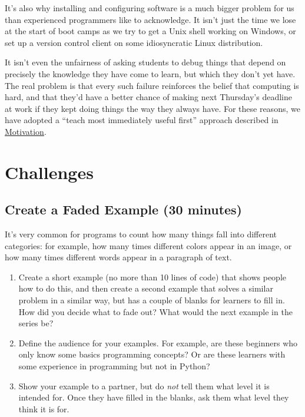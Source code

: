 \documentclass[10pt,statementpaper]{memoir}
\begin{document}
It's also why installing and configuring software is a much bigger
problem for us than experienced programmers like to acknowledge. It
isn't just the time we lose at the start of boot camps as we try to get
a Unix shell working on Windows, or set up a version control client on
some idiosyncratic Linux distribution.

It isn't even the unfairness of asking students to debug things that
depend on precisely the knowledge they have come to learn, but which
they don't yet have. The real problem is that every such failure
reinforces the belief that computing is hard, and that they'd have a
better chance of making next Thursday's deadline at work if they kept
doing things the way they always have. For these reasons, we have
adopted a ``teach most immediately useful first'' approach described in
\href{motivation.html}{Motivation}.

\section{Challenges}\label{challenges-4}

\subsection{Create a Faded Example (30
minutes)}\label{create-a-faded-example-30-minutes}

It's very common for programs to count how many things fall into
different categories: for example, how many times different colors
appear in an image, or how many times different words appear in a
paragraph of text.

\begin{enumerate}
\def\labelenumi{\arabic{enumi}.}
\item
  Create a short example (no more than 10 lines of code) that shows
  people how to do this, and then create a second example that solves a
  similar problem in a similar way, but has a couple of blanks for
  learners to fill in. How did you decide what to fade out? What would
  the next example in the series be?
\item
  Define the audience for your examples. For example, are these
  beginners who only know some basics programming concepts? Or are these
  learners with some experience in programming but not in Python?
\item
  Show your example to a partner, but do \emph{not} tell them what level
  it is intended for. Once they have filled in the blanks, ask them what
  level they think it is for.
\end{enumerate}
\end{document}
